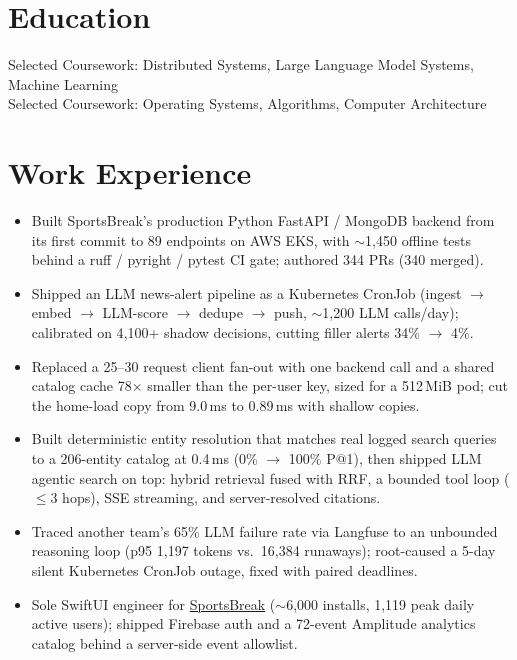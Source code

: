 \documentclass[11pt, letterpaper]{article}
\begin{document}

\section{Education}
Selected Coursework: Distributed Systems, Large Language Model Systems, Machine Learning\\[1pt]
Selected Coursework: Operating Systems, Algorithms, Computer Architecture

\section{Work Experience}
\begin{itemize}
  \item Built SportsBreak's production Python FastAPI / MongoDB backend from its first commit to 89 endpoints on AWS EKS, with $\sim$1{,}450 offline tests behind a ruff / pyright / pytest CI gate; authored 344 PRs (340 merged).
  \item Shipped an LLM news-alert pipeline as a Kubernetes CronJob (ingest $\to$ embed $\to$ LLM-score $\to$ dedupe $\to$ push, $\sim$1{,}200 LLM calls/day); calibrated on 4{,}100+ shadow decisions, cutting filler alerts 34\% $\to$ 4\%.
  \item Replaced a 25--30 request client fan-out with one backend call and a shared catalog cache 78$\times$ smaller than the per-user key, sized for a 512\,MiB pod; cut the home-load copy from 9.0\,ms to 0.89\,ms with shallow copies.
  \item Built deterministic entity resolution that matches real logged search queries to a 206-entity catalog at 0.4\,ms (0\% $\to$ 100\% P@1), then shipped LLM agentic search on top: hybrid retrieval fused with RRF, a bounded tool loop ($\le$3 hops), SSE streaming, and server-resolved citations.
  \item Traced another team's 65\% LLM failure rate via Langfuse to an unbounded reasoning loop (p95 1{,}197 tokens vs.\ 16{,}384 runaways); root-caused a 5-day silent Kubernetes CronJob outage, fixed with paired deadlines.
  \item Sole SwiftUI engineer for \href{https://apps.apple.com/app/id6762649287}{SportsBreak} ($\sim$6{,}000 installs, 1{,}119 peak daily active users); shipped Firebase auth and a 72-event Amplitude analytics catalog behind a server-side event allowlist.
\end{itemize}
\end{document}
